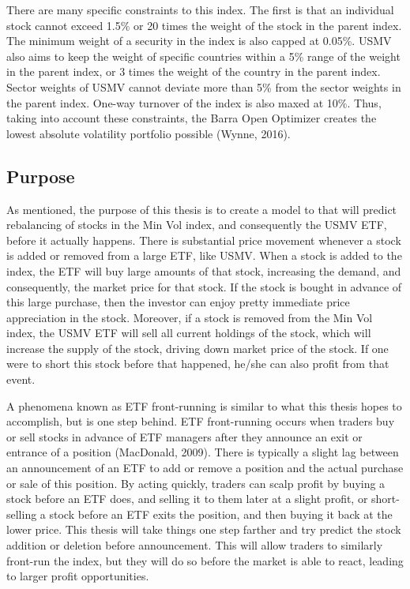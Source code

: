 \documentclass[12pt,twoside]{reedthesis}
\theoremstyle{definition}
\theoremstyle{definition}
\theoremstyle{definition}
\theoremstyle{remark}
\begin{document}
There are many specific constraints to this index. The first is that an
individual stock cannot exceed 1.5\% or 20 times the weight of the stock
in the parent index. The minimum weight of a security in the index is
also capped at 0.05\%. USMV also aims to keep the weight of specific
countries within a 5\% range of the weight in the parent index, or 3
times the weight of the country in the parent index. Sector weights of
USMV cannot deviate more than 5\% from the sector weights in the parent
index. One-way turnover of the index is also maxed at 10\%. Thus, taking
into account these constraints, the Barra Open Optimizer creates the
lowest absolute volatility portfolio possible (Wynne, 2016).

\subsection{Purpose}\label{purpose}

As mentioned, the purpose of this thesis is to create a model to that
will predict rebalancing of stocks in the Min Vol index, and
consequently the USMV ETF, before it actually happens. There is
substantial price movement whenever a stock is added or removed from a
large ETF, like USMV. When a stock is added to the index, the ETF will
buy large amounts of that stock, increasing the demand, and
consequently, the market price for that stock. If the stock is bought in
advance of this large purchase, then the investor can enjoy pretty
immediate price appreciation in the stock. Moreover, if a stock is
removed from the Min Vol index, the USMV ETF will sell all current
holdings of the stock, which will increase the supply of the stock,
driving down market price of the stock. If one were to short this stock
before that happened, he/she can also profit from that event.

A phenomena known as ETF front-running is similar to what this thesis
hopes to accomplish, but is one step behind. ETF front-running occurs
when traders buy or sell stocks in advance of ETF managers after they
announce an exit or entrance of a position (MacDonald, 2009). There is
typically a slight lag between an announcement of an ETF to add or
remove a position and the actual purchase or sale of this position. By
acting quickly, traders can scalp profit by buying a stock before an ETF
does, and selling it to them later at a slight profit, or short-selling
a stock before an ETF exits the position, and then buying it back at the
lower price. This thesis will take things one step farther and try
predict the stock addition or deletion before announcement. This will
allow traders to similarly front-run the index, but they will do so
before the market is able to react, leading to larger profit
opportunities.
\end{document}
